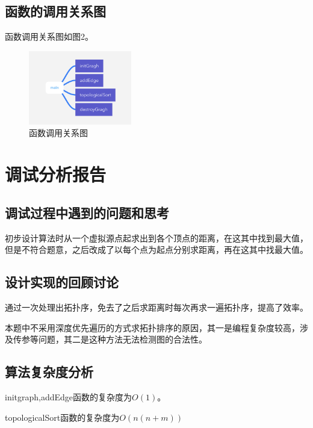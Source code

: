 \documentclass{article}
\begin{document}
\subsection{函数的调用关系图}

函数调用关系图如图2。

\begin{figure}[htbp]

    \centering\includegraphics[width=0.4\textwidth]{./Images/pic5_2.png}

    \caption{函数调用关系图}

\end{figure}

\section{调试分析报告}

\subsection{调试过程中遇到的问题和思考}

初步设计算法时从一个虚拟源点起求出到各个顶点的距离，在这其中找到最大值，但是不符合题意，之后改成了以每个点为起点分别求距离，再在这其中找最大值。

\subsection{设计实现的回顾讨论}

通过一次处理出拓扑序，免去了之后求距离时每次再求一遍拓扑序，提高了效率。

本题中不采用深度优先遍历的方式求拓扑排序的原因，其一是编程复杂度较高，涉及传参等问题，其二是这种方法无法检测图的合法性。

\subsection{算法复杂度分析}

initgraph,addEdge函数的复杂度为$O(1)$。

topologicalSort函数的复杂度为$O(n(n+m))$
\end{document}
